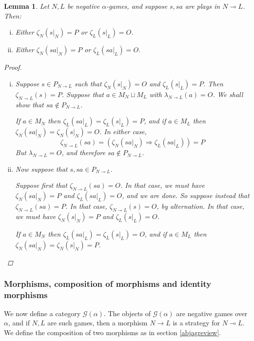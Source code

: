 \documentclass[11pt]{article} %
\theoremstyle{plain} %
\newtheorem{lemma}[theorem]{Lemma}
\theoremstyle{definition} %
\theoremstyle{exercisestyle}
\renewcommand{\implies}{\multimap}
\newcommand{\cprd}{\sqcup}
\newcommand{\G}{\mathcal G}
\begin{document}
\begin{lemma}
  Let $N,L$ be negative $\alpha$-games, and suppose $s,sa$ are plays in $N\implies L$.  Then:
  \begin{enumerate}[i)]
    \item Either $\zeta_N(s\vert_N)=P$ or $\zeta_L(s\vert_L)=O$.
    \item Either $\zeta_N(sa\vert_N)=P$ or $\zeta_L(sa\vert_L)=O$.
  \end{enumerate}
  \begin{proof}
    \begin{enumerate}[(i):]
      \item Suppose $s\in P_{N\implies L}$ such that $\zeta_N(s\vert_N)=O$ and $\zeta_L(s\vert_L)=P$.  Then $\zeta_{N\implies L}(s)=P$.  Suppose that $a\in M_N\cprd M_L$ with $\lambda_{N\implies L}(a)=O$.  We shall show that $sa\not \in P_{N\implies L}$.

        If $a\in M_N$ then $\zeta_L(sa\vert_L)=\zeta_L(s\vert_L)=P$, and if $a\in M_L$ then $\zeta_N(sa\vert_N)=\zeta_N(s\vert_N)=O$.  In either case, 
        \[
          \zeta_{N\implies L}(sa)=(\zeta_N(sa\vert_N)\Rightarrow\zeta_L(sa\vert_L))=P
        \]
        But $\lambda_{N\implies L}=O$, and therefore $sa\not\in P_{N\implies L}$.

      \item Now suppose that $s,sa\in P_{N\implies L}$.
        
        Suppose first that $\zeta_{N\implies L}(sa)=O$.  In that case, we must have $\zeta_N(sa\vert_N)=P$ \emph{and} $\zeta_L(sa\vert_L)=O$, and we are done.  So suppose instead that $\zeta_{N\implies L}(sa)=P$.  In that case, $\zeta_{N\implies L}(s)=O$, by alternation.  In that case, we must have $\zeta_N(s\vert_N)=P$ and $\zeta_L(s\vert_L)=O$.  

        If $a\in M_N$ then $\zeta_L(sa\vert_L)=\zeta_L(s\vert_L)=O$, and if $a\in M_L$ then $\zeta_N(sa\vert_N)=\zeta_N(s\vert_N)=P$.
    \end{enumerate}
  \end{proof}
\end{lemma}

\subsubsection{Morphisms, composition of morphisms and identity morphisms}

We now define a category $\G(\alpha)$.  The objects of $\G(\alpha)$ are negative games over $\alpha$, and if $N,L$ are such games, then a morphism $N\to L$ is a strategy for $N\implies L$.  We define the composition of two morphisms as in section \ref{abjagreview}.
\end{document}
